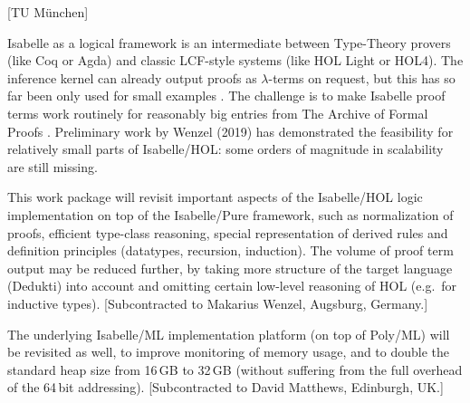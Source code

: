 [TU München]

Isabelle as a logical framework \cite{paulson700} is an intermediate
between Type-Theory provers (like Coq or Agda) and classic LCF-style
systems (like HOL Light or HOL4). The inference kernel can already
output proofs as $\lambda$-terms on request, but this has so far been
only used for small examples \cite{Berghofer-Nipkow:2000:TPHOL}. The
challenge is to make Isabelle proof terms work routinely for
reasonably big entries from The Archive of Formal Proofs
\cite{isabelle-afp}. Preliminary work by Wenzel (2019) has
demonstrated the feasibility for relatively small parts of
Isabelle/HOL: some orders of magnitude in scalability are still
missing.

This work package will revisit important aspects of the Isabelle/HOL
logic implementation on top of the Isabelle/Pure framework, such as
normalization of proofs, efficient type-class reasoning, special
representation of derived rules and definition principles (datatypes,
recursion, induction). The volume of proof term output may be reduced
further, by taking more structure of the target language (Dedukti)
into account and omitting certain low-level reasoning of HOL (e.g.\
for inductive types). [Subcontracted to Makarius Wenzel, Augsburg,
Germany.]

The underlying Isabelle/ML implementation platform (on top of Poly/ML)
will be revisited as well, to improve monitoring of memory usage, and
to double the standard heap size from 16\,GB to 32\,GB (without
suffering from the full overhead of the 64\,bit
addressing). [Subcontracted to David Matthews, Edinburgh, UK.]
